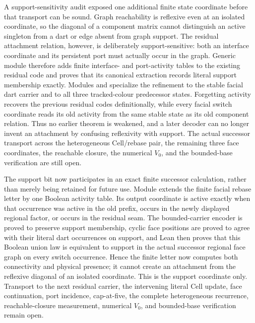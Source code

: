 \documentclass[11pt]{article}
\theoremstyle{definition}
\begin{document}
A support-sensitivity audit exposed one additional finite state coordinate
before that transport can be sound.  Graph reachability is reflexive even at
an isolated coordinate, so the diagonal of a component matrix cannot
distinguish an active singleton from a dart or edge absent from graph support.
The residual attachment relation, however, is deliberately support-sensitive:
both an interface coordinate and its persistent port must actually occur in
the graph.  Generic module
 therefore
adds finite interface- and port-activity tables to the existing residual code
and proves that its canonical extraction records literal support membership
exactly.  Modules
 and
specialize the refinement to the stable facial dart carrier and to all three
tracked-colour predecessor states.  Forgetting activity recovers the previous
residual codes definitionally, while every facial switch coordinate reads its
old activity from the same stable state as its old component relation.  Thus
no earlier theorem is weakened, and a later decoder can no longer invent an
attachment by confusing reflexivity with support.  The actual successor
transport across the heterogeneous Cell/rebase pair, the remaining three face
coordinates, the reachable closure, the numerical $V_0$, and the bounded-base
verification are still open.

The support bit now participates in an exact finite successor calculation,
rather than merely being retained for future use.  Module
extends the finite facial rebase letter by one Boolean activity table.  Its
output coordinate is active exactly when that occurrence was active in the
old prefix, occurs in the newly displayed regional factor, or occurs in the
residual seam.  The bounded-carrier encoder is proved to preserve support
membership, cyclic face positions are proved to agree with their literal dart
occurrences on support, and Lean then proves that this Boolean union law is
equivalent to support in the actual successor regional face graph on every
switch occurrence.  Hence the finite letter now computes both connectivity
and physical presence; it cannot create an attachment from the reflexive
diagonal of an isolated coordinate.  This is the support coordinate only.
Transport to the next residual carrier, the intervening literal Cell update,
face continuation, port incidence, cap-at-five, the complete heterogeneous
recurrence, reachable-closure measurement, numerical $V_0$, and bounded-base
verification remain open.
\end{document}
